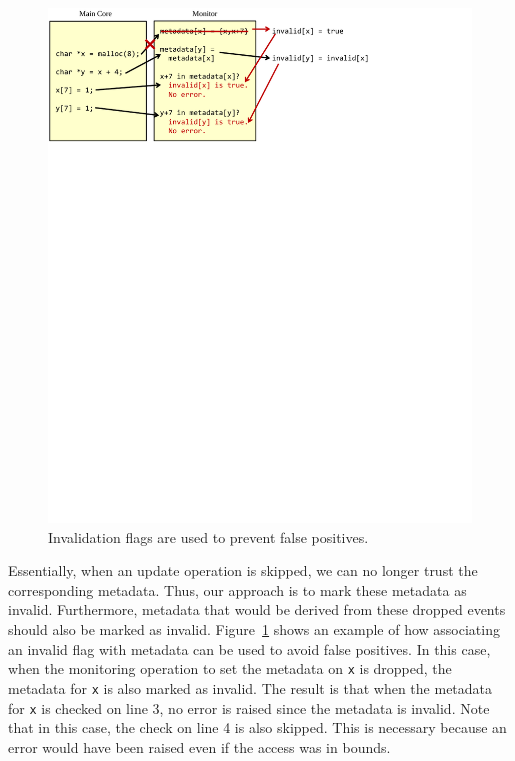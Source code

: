 \begin{figure}
  \begin{center}
    \includegraphics[]{figs/example_invalid.pdf}
    \caption{Invalidation flags are used to prevent false positives.}
    \label{fig:dropping.example_invalid}
    \vspace{-0.1in}
  \end{center}
\end{figure}

Essentially, when an update operation is skipped, we can no longer trust the
corresponding metadata.  Thus, our approach is to mark these metadata as
invalid. Furthermore, metadata that would be derived from these dropped events
should also be marked as invalid. Figure~\ref{fig:dropping.example_invalid}
shows an example of how associating an invalid flag with metadata can be used
to avoid false positives.  In this case, when the monitoring operation to set
the metadata on {\tt x} is dropped, the metadata for {\tt x} is also marked as
invalid. The result is that when the metadata for {\tt x} is checked on line 3,
no error is raised since the metadata is invalid. Note that in this case, the
check on line 4 is also skipped. This is necessary because an error would have
been raised even if the access was in bounds.

